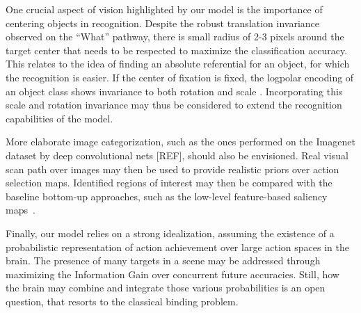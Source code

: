 

One crucial aspect of vision highlighted by our model is the importance of centering objects in recognition. Despite the robust translation invariance observed on the ``What'' pathway, there is small radius of 2-3 pixels around the target center that needs to be respected to maximize the classification accuracy. This relates to the idea of finding an absolute referential for an object, for which the recognition is easier. If the center of fixation is fixed, the logpolar encoding of an object class shows invariance to both rotation and scale \citep{Traver10}. Incorporating this scale and rotation invariance may thus be considered to extend the recognition capabilities of the model.

More elaborate image categorization, such as the ones performed on the Imagenet dataset by deep convolutional nets [REF], should also be envisioned.
Real visual scan path over images may then be used to provide realistic priors over action selection maps.  %
Identified regions of interest may then be compared with the baseline bottom-up approaches, such as the low-level feature-based saliency maps~\citep{Itti01}. 


Finally, our model relies on a strong idealization, assuming the existence of a probabilistic representation of action achievement over large action spaces in the brain. 
The presence of many targets in a scene may be addressed %
through maximizing the Information Gain over concurrent future accuracies. %
Still, how the brain may combine and integrate those various probabilities is an open question, that resorts to the classical binding problem. %
